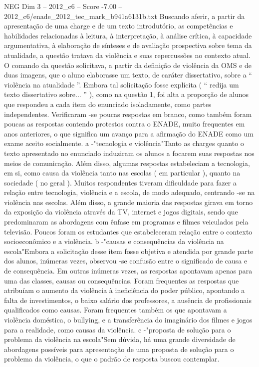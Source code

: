 \begin{textsample}{NEG Dim 3 – 2012\_c6 – Score -7.00 – 2012\_c6/enade\_2012\_tec\_mark\_b941a6131b.txt}
Buscando aferir, a partir da apresentação de uma charge e de um texto introdutório, as competências e habilidades relacionadas à leitura, à interpretação, à análise crítica, à capacidade argumentativa, à elaboração de sínteses e de avaliação prospectiva sobre tema da atualidade, a questão tratava da violência e suas repercussões no contexto atual.
O comando da questão solicitava, a partir da definição de violência da OMS e de duas imagens, que o aluno elaborasse um texto, de caráter dissertativo, sobre a “ violência na atualidade ”.
Embora tal solicitação fosse explícita ( “ redija um texto dissertativo sobre... ” ), como na questão 1, foi alta a proporção de alunos que respondeu a cada item do enunciado isoladamente, como partes independentes.
Verificaram -se poucas respostas em branco, como também foram poucas as respostas contendo protestos contra o ENADE, muito frequentes em anos anteriores, o que significa um avanço para a afirmação do ENADE como um exame aceito socialmente. a -"tecnologia e violência"Tanto as charges quanto o texto apresentado no enunciado induziram os alunos a focarem suas respostas nos meios de comunicação.
Além disso, algumas respostas estabeleciam a tecnologia, em si, como causa da violência tanto nas escolas ( em particular ), quanto na sociedade ( no geral ).
Muitos respondentes tiveram dificuldade para fazer a relação entre tecnologia, violência e a escola, de modo adequado, centrando -se na violência nas escolas.
Além disso, a grande maioria das respostas girava em torno da exposição da violência através da TV, internet e jogos digitais, sendo que predominaram as abordagens com ênfase em programas e filmes veiculados pela televisão.
Poucos foram os estudantes que estabeleceram relação entre o contexto socioeconômico e a violência. b -"causas e consequências da violência na escola"Embora a solicitação desse item fosse objetiva e atendida por grande parte dos alunos, inúmeras vezes, observou -se confusão entre o significado de causa e de consequência.
Em outras inúmeras vezes, as respostas apontavam apenas para uma das classes, causas ou consequências.
Foram frequentes as respostas que atribuíam o aumento da violência à ineficiência do poder público, apontando a falta de investimentos, o baixo salário dos professores, a ausência de profissionais qualificados como causas.
Foram frequentes também os que apontavam a violência doméstica, o bullying, e a transferência do imaginário dos filmes e jogos para a realidade, como causas da violência. c -"proposta de solução para o problema da violência na escola"Sem dúvida, há uma grande diversidade de abordagens possíveis para apresentação de uma proposta de solução para o problema da violência, o que o padrão de resposta buscou contemplar.

\end{textsample}
